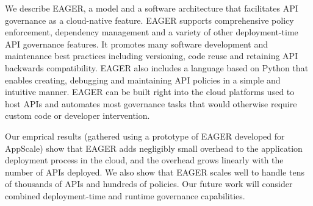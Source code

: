 
We describe EAGER, a model and a software architecture that facilitates API
governance as a cloud-native feature. EAGER supports comprehensive policy
enforcement, dependency management and a variety of other deployment-time API
governance features. It promotes many software development and maintenance
best practices including versioning, code reuse and retaining API backwards
compatibility. EAGER also includes a language based on Python that enables
creating, debugging and maintaining API policies in a simple and intuitive
manner. EAGER can be built right into the cloud platforms used to host APIs
and automates most governance tasks that would otherwise require custom code
or developer intervention.

Our emprical results (gathered using a prototype of EAGER developed for
AppScale)
show that EAGER adds negligibly small overhead to the application deployment process in the cloud, and the overhead grows linearly
with the number of APIs deployed. We also show that EAGER scales well to handle tens of thousands of APIs and hundreds of policies. 
Our future work will consider combined deployment-time and runtime
governance capabilities.
